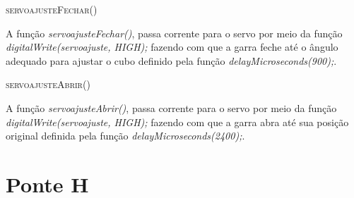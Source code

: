  \begin{algorithm}[H]
   \SetAlgoLined
   \label{alg1}
   \caption{\textsc{servoajusteFechar()}}
 \end{algorithm}
 
 A função \textit{servoajusteFechar()}, passa corrente para o servo por meio da função 
 \textit{digitalWrite(servoajuste, HIGH);} fazendo com que a garra feche até o ângulo adequado para ajustar o cubo definido pela função \textit{delayMicroseconds(900);}.
 
 \begin{algorithm}[H]
   \SetAlgoLined
   \label{alg1}
   \caption{\textsc{servoajusteAbrir()}}
 \end{algorithm}
 
 
 A função \textit{servoajusteAbrir()}, passa corrente para o servo por meio da função 
 \textit{digitalWrite(servoajuste, HIGH);} fazendo com que a garra abra até sua posição original definida pela função \textit{delayMicroseconds(2400);}.



\section{Ponte H}

